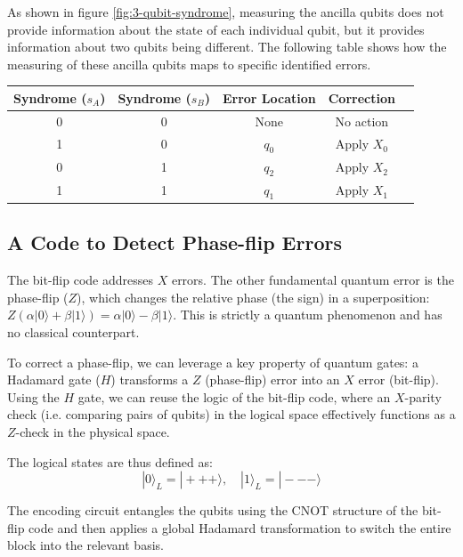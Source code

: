 As shown in figure \ref{fig:3-qubit-syndrome}, measuring the ancilla qubits does not provide information about the state of each individual qubit, but it provides information about two qubits being different. The following table shows how the measuring of these ancilla qubits maps to specific identified errors.

\begin{table}[H]
    \centering
    \small
    \renewcommand{\arraystretch}{1.2} 
    \begin{tabular}{@{}ccccl@{}}
        \hline
        \textbf{Syndrome ($s_A$)} & \textbf{Syndrome ($s_B$)} & \textbf{Error Location} & \textbf{Correction} \\ \hline
        0 & 0 & None & No action \\
        1 & 0 & $q_0$ & Apply $X_0$ \\
        0 & 1 & $q_2$ & Apply $X_2$ \\
        1 & 1 & $q_1$ & Apply $X_1$ \\ \hline
    \end{tabular}
    \label{tab:3-qubit-syndrome_table}
\end{table}

\subsection*{A Code to Detect Phase-flip Errors}
The bit-flip code addresses $X$ errors. The other fundamental quantum error is the phase-flip ($Z$), which changes the relative phase (the sign) in a superposition: $Z(\alpha|0\rangle + \beta|1\rangle) = \alpha|0\rangle - \beta|1\rangle$. This is strictly a quantum phenomenon and has no classical counterpart.

To correct a phase-flip, we can leverage a key property of quantum gates: a Hadamard gate ($H$) transforms a $Z$ (phase-flip) error into an $X$ error (bit-flip). Using the $H$ gate, we can reuse the logic of the bit-flip code, where an $X$-parity check (i.e. comparing pairs of qubits) in the logical space effectively functions as a $Z$-check in the physical space.

The logical states are thus defined as:
\[ |0\rangle_L = |+++\rangle, \quad |1\rangle_L = |---\rangle \]

The encoding circuit entangles the qubits using the CNOT structure of the bit-flip code and then applies a global Hadamard transformation to switch the entire block into the relevant basis.

